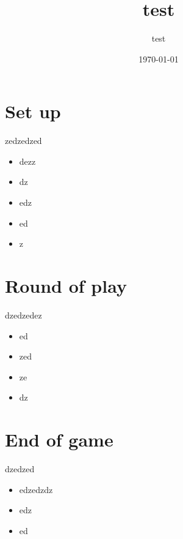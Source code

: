 \documentclass{article}%
\title{test}%
\author{test}%
\date{\today}%
\begin{document}
%
\pagestyle{empty}%
\normalsize%
\maketitle%
\section{ Set up
}%
\label{sec:Setup}%
zedzedzed
%
\begin{itemize}%
\item%
%
 dezz
%
\item%
%
 dz
%
\item%
%
 edz
%
\item%
%
 ed
%
\item%
%
 z
%
\end{itemize}

%
\section{ Round of play
}%
\label{sec:Roundofplay}%
dzedzedez
%
\begin{itemize}%
\item%
%
 ed
%
\item%
%
 zed
%
\item%
%
 ze
%
\item%
%
 dz
%
\end{itemize}

%
\section{ End of game
}%
\label{sec:Endofgame}%
dzedzed 
%
\begin{itemize}%
\item%
%
 edzedzdz
%
\item%
%
 edz
%
\item%
%
 ed%
\end{itemize}

%
\end{document}
